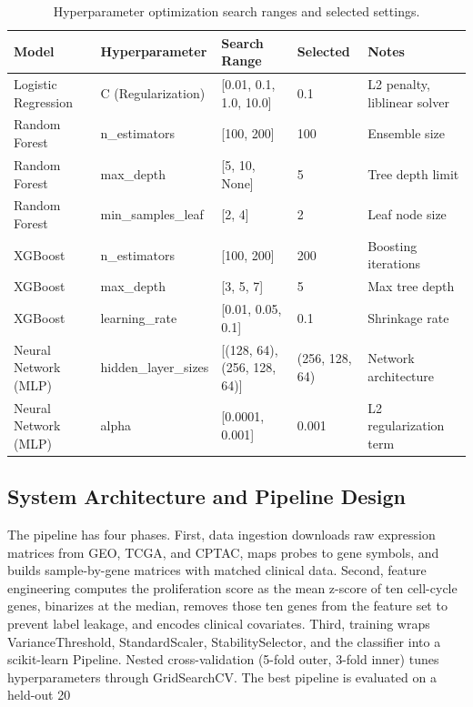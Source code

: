 \documentclass[11pt]{article}
\begin{document}
\begin{table}[H]
\centering
\caption{Hyperparameter optimization search ranges and selected settings.}
\begin{tabular}{lllll}
\toprule
\textbf{Model} & \textbf{Hyperparameter} & \textbf{Search Range} & \textbf{Selected} & \textbf{Notes} \\
\midrule
  Logistic Regression & C (Regularization) & [0.01, 0.1, 1.0, 10.0] & 0.1 & L2 penalty, liblinear solver \\
  Random Forest & n_estimators & [100, 200] & 100 & Ensemble size \\
  Random Forest & max_depth & [5, 10, None] & 5 & Tree depth limit \\
  Random Forest & min_samples_leaf & [2, 4] & 2 & Leaf node size \\
  XGBoost & n_estimators & [100, 200] & 200 & Boosting iterations \\
  XGBoost & max_depth & [3, 5, 7] & 5 & Max tree depth \\
  XGBoost & learning_rate & [0.01, 0.05, 0.1] & 0.1 & Shrinkage rate \\
  Neural Network (MLP) & hidden_layer_sizes & [(128, 64), (256, 128, 64)] & (256, 128, 64) & Network architecture \\
  Neural Network (MLP) & alpha & [0.0001, 0.001] & 0.001 & L2 regularization term \\
\bottomrule
\end{tabular}
\end{table}

\subsection*{System Architecture and Pipeline Design}
The pipeline has four phases. First, data ingestion downloads raw expression matrices from GEO, TCGA, and CPTAC, maps probes to gene symbols, and builds sample-by-gene matrices with matched clinical data. Second, feature engineering computes the proliferation score as the mean z-score of ten cell-cycle genes, binarizes at the median, removes those ten genes from the feature set to prevent label leakage, and encodes clinical covariates. Third, training wraps VarianceThreshold, StandardScaler, StabilitySelector, and the classifier into a scikit-learn Pipeline. Nested cross-validation (5-fold outer, 3-fold inner) tunes hyperparameters through GridSearchCV. The best pipeline is evaluated on a held-out 20%
\end{document}
